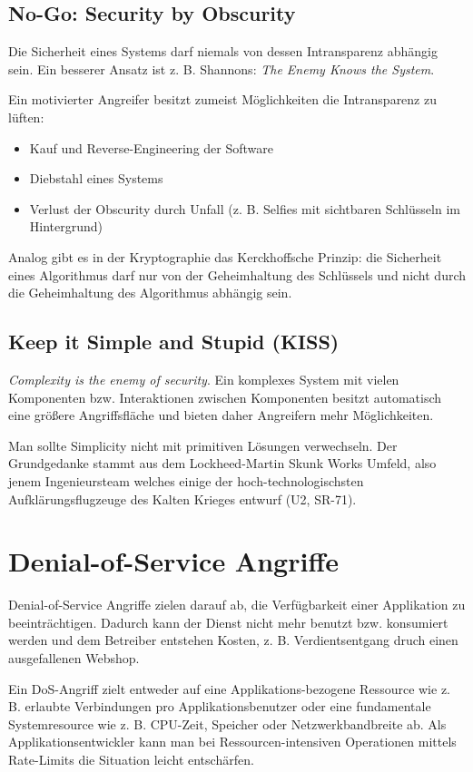\subsection{No-Go: Security by Obscurity}

Die Sicherheit eines Systems darf niemals von dessen Intransparenz abhängig sein. Ein besserer Ansatz ist z. B. Shannons: \textit{The Enemy Knows the System}.

Ein motivierter Angreifer besitzt zumeist Möglichkeiten die Intransparenz zu lüften:
\begin{itemize}
	\item Kauf und Reverse-Engineering der Software
	\item Diebstahl eines Systems
	\item Verlust der Obscurity durch Unfall (z. B. Selfies mit sichtbaren Schlüsseln im Hintergrund)
\end{itemize}

Analog gibt es in der Kryptographie das Kerckhoffsche Prinzip: die Sicherheit eines Algorithmus darf nur von der Geheimhaltung des Schlüssels und nicht durch die Geheimhaltung des Algorithmus abhängig sein.

\subsection{Keep it Simple and Stupid (KISS)}

\textit{Complexity is the enemy of security}. Ein komplexes System mit vielen Komponenten bzw. Interaktionen zwischen Komponenten besitzt automatisch eine größere Angriffsfläche und bieten daher Angreifern mehr Möglichkeiten.

Man sollte Simplicity nicht mit primitiven Lösungen verwechseln. Der Grundgedanke stammt aus dem Lockheed-Martin Skunk Works Umfeld, also jenem Ingenieursteam welches einige der hoch-technologischsten Aufklärungsflugzeuge des Kalten Krieges entwurf (U2, SR-71).

\section{Denial-of-Service Angriffe}

Denial-of-Service Angriffe zielen darauf ab, die Verfügbarkeit einer Applikation zu beeinträchtigen. Dadurch kann der Dienst nicht mehr benutzt bzw. konsumiert werden und dem Betreiber entstehen Kosten, z. B. Verdientsentgang druch einen ausgefallenen Webshop.

Ein DoS-Angriff zielt entweder auf eine Applikations-bezogene Ressource wie z. B. erlaubte Verbindungen pro Applikationsbenutzer oder eine fundamentale Systemresource wie z. B. CPU-Zeit, Speicher oder Netzwerkbandbreite ab. Als Applikationsentwickler kann man bei Ressourcen-intensiven Operationen mittels Rate-Limits die Situation leicht entschärfen.

